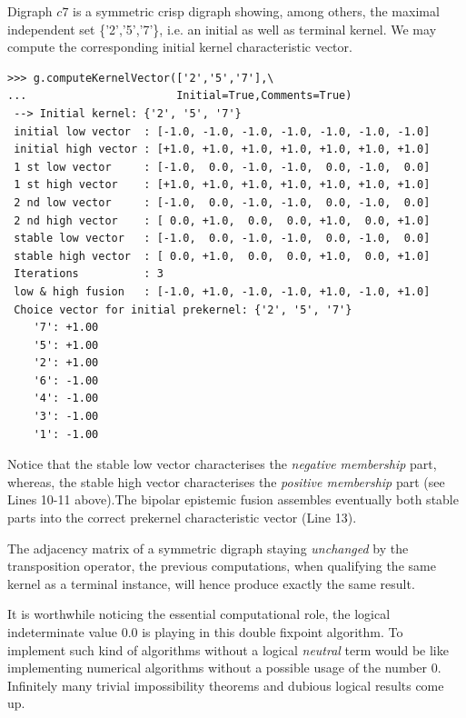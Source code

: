 Digraph $c7$ is a symmetric crisp digraph showing, among others, the maximal independent set \{'2','5','7'\}, i.e. an initial as well as terminal kernel. We may compute the corresponding initial kernel characteristic vector.
\begin{lstlisting}
>>> g.computeKernelVector(['2','5','7'],\
...                       Initial=True,Comments=True)
 --> Initial kernel: {'2', '5', '7'}
 initial low vector  : [-1.0, -1.0, -1.0, -1.0, -1.0, -1.0, -1.0]
 initial high vector : [+1.0, +1.0, +1.0, +1.0, +1.0, +1.0, +1.0]
 1 st low vector     : [-1.0,  0.0, -1.0, -1.0,  0.0, -1.0,  0.0]
 1 st high vector    : [+1.0, +1.0, +1.0, +1.0, +1.0, +1.0, +1.0]
 2 nd low vector     : [-1.0,  0.0, -1.0, -1.0,  0.0, -1.0,  0.0]
 2 nd high vector    : [ 0.0, +1.0,  0.0,  0.0, +1.0,  0.0, +1.0]
 stable low vector   : [-1.0,  0.0, -1.0, -1.0,  0.0, -1.0,  0.0]
 stable high vector  : [ 0.0, +1.0,  0.0,  0.0, +1.0,  0.0, +1.0]
 Iterations          : 3
 low & high fusion   : [-1.0, +1.0, -1.0, -1.0, +1.0, -1.0, +1.0]
 Choice vector for initial prekernel: {'2', '5', '7'}
    '7': +1.00
    '5': +1.00
    '2': +1.00
    '6': -1.00
    '4': -1.00
    '3': -1.00
    '1': -1.00
\end{lstlisting}
Notice that the stable low vector characterises the \emph{negative membership} part, whereas, the stable high vector characterises the \emph{positive membership} part (see Lines 10-11 above).The bipolar epistemic fusion assembles eventually both stable parts into the correct prekernel characteristic vector (Line 13). 

The adjacency matrix of a symmetric digraph staying \emph{unchanged} by the transposition operator, the previous computations, when qualifying the same kernel as a terminal instance, will hence produce exactly the same result.

It is worthwhile noticing the essential computational role, the logical indeterminate value $0.0$ is playing in this double fixpoint algorithm. To implement such kind of algorithms without a logical \emph{neutral} term would be like implementing numerical algorithms without a possible usage of the number $0$. Infinitely many trivial impossibility theorems and dubious logical results come up. 
